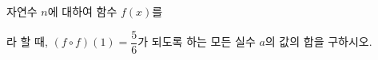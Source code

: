 자연수 $n$에 대하여 함수 $f(x)$를 \par\smallskip{}\par\smallskip\noindent 라 할 때, $(f\circ f)(1)=\dfrac{5}{6}$가 되도록 하는 모든 실수 $a$의 값의 합을 구하시오.
